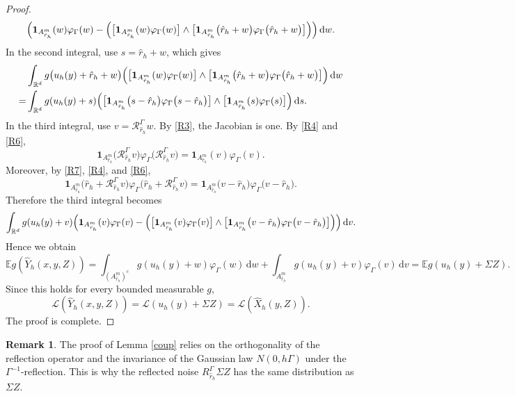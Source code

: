 \documentclass[aap]{imsart}
\theoremstyle{plain}
\theoremstyle{definition}
\newtheorem{remark}{Remark}
\begin{document}
\begin{proof}
\[\begin{aligned}
		\Bigl(\mathbf 1_{A_{\hat r_h}^m}(w)
		\varphi_\Gamma(w)-\Bigl(
		\bigl[
		\mathbf 1_{A_{\hat r_h}^m}(w)
		\varphi_\Gamma(w)
		\bigr]\wedge
		\bigl[
		\mathbf 1_{A_{\hat r_h}^m}
		\bigl(\hat r_h+w\bigr)
		\varphi_\Gamma\bigl(\hat r_h+w\bigr)
		\bigr]
		\Bigr)
		\Bigr)\,\mathrm dw .
	\end{aligned}
	\]
	In the second integral, use \(s=\hat r_h+w\), which gives
	\[\begin{aligned}
		&\int_{\mathbb R^d}
		g\bigl(u_h(y)+\hat r_h+w\bigr)\Bigl(
		\bigl[
		\mathbf 1_{A_{\hat r_h}^m}(w)
		\varphi_\Gamma(w)
		\bigr]\wedge
		\bigl[
		\mathbf 1_{A_{\hat r_h}^m}
		\bigl(\hat r_h+w\bigr)
		\varphi_\Gamma\bigl(\hat r_h+w\bigr)
		\bigr]
		\Bigr)\,\mathrm dw \\
		=&
		\int_{\mathbb R^d}
		g(u_h(y)+s)\Bigl(
		\bigl[
		\mathbf 1_{A_{\hat r_h}^m}
		\bigl(s-\hat r_h\bigr)
		\varphi_\Gamma\bigl(s-\hat r_h\bigr)
		\bigr]\wedge
		\bigl[
		\mathbf 1_{A_{\hat r_h}^m}(s)
		\varphi_\Gamma(s)
		\bigr]
		\Bigr)\,\mathrm ds .
	\end{aligned}\]	
	In the third integral, use \(v=\mathcal R_{\hat r_h}^\Gamma w\). By \eqref{R3}, the Jacobian is one. By \eqref{R4} and \eqref{R6},
	\[
	\mathbf 1_{A_{\hat r_h}^m}
	\bigl(\mathcal R_{\hat r_h}^\Gamma v\bigr)
	\varphi_\Gamma
	\bigl(\mathcal R_{\hat r_h}^\Gamma v\bigr)
	=
	\mathbf 1_{A_{\hat r_h}^m}(v)\varphi_\Gamma(v).
	\]
	Moreover, by \eqref{R7}, \eqref{R4}, and \eqref{R6},
	\[\mathbf 1_{A_{\hat r_h}^m}
		\bigl(
		\hat r_h+
		\mathcal R_{\hat r_h}^\Gamma v
		\bigr)
		\varphi_\Gamma
		\bigl(
		\hat r_h+
		\mathcal R_{\hat r_h}^\Gamma v
		\bigr) =
		\mathbf 1_{A_{\hat r_h}^m}
		\bigl(v-\hat r_h\bigr)
		\varphi_\Gamma
		\bigl(v-\hat r_h\bigr).\]
	Therefore the third integral becomes
	\[\int_{\mathbb R^d}
		g(u_h(y)+v)
		\Bigl(
		\mathbf 1_{A_{\hat r_h}^m}(v)\varphi_\Gamma(v)
		-
		\Bigl(
		\bigl[
		\mathbf 1_{A_{\hat r_h}^m}(v)
		\varphi_\Gamma(v)
		\bigr]
		\wedge
		\bigl[
		\mathbf 1_{A_{\hat r_h}^m}
		\bigl(v-\hat r_h\bigr)
		\varphi_\Gamma
		\bigl(v-\hat r_h\bigr)
		\bigr]
		\Bigr)
		\Bigr)
		\,\mathrm dv.\]
	Hence we obtain
	\[\mathbb E g(\hat Y_h(x,y,Z))=
		\int_{(A_{\hat r_h}^m)^c}
		g(u_h(y)+w)\varphi_\Gamma(w)\,\mathrm dw +
		\int_{A_{\hat r_h}^m}
		g(u_h(y)+v)\varphi_\Gamma(v)\,\mathrm dv =
		\mathbb E g(u_h(y)+\Sigma Z).\]
	Since this holds for every bounded measurable \(g\),
	\[\mathcal L(\hat Y_h(x,y,Z))=\mathcal L(u_h(y)+\Sigma Z)=\mathcal L(\hat X_h(y,Z)).\]
	The proof is complete.
\end{proof}

	\begin{remark}
			The proof of Lemma \ref{coup} relies on the orthogonality of the reflection
			operator and the invariance of the Gaussian law \(N(0, h\Gamma)\) under the \(\Gamma^{-1}\)-reflection. This is why
			the reflected noise \(R_{\hat r_h}^\Gamma \Sigma Z\) has the same distribution as
			\(\Sigma Z\).
		\end{remark}
\end{document}
